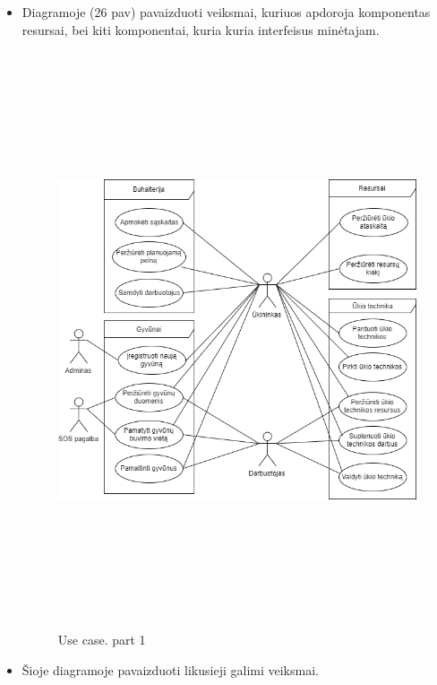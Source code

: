 \documentclass[oneside]{VUMIFPSkursinis}
\begin{document}
\begin{itemize}
\item Diagramoje (26 pav) pavaizduoti veiksmai, kuriuos apdoroja komponentas resursai, bei kiti komponentai, kuria kuria interfeisus minėtajam.
		\begin{figure}[H]
		\centering	
	\includegraphics[width=15cm,height=17cm,keepaspectratio]{ResursaiUseCase.png}
	\caption{Use case. part 1}
	\label{fig:UseCaseFull}
\end{figure}
\item Šioje diagramoje pavaizduoti likusieji galimi veiksmai.
		\begin{figure}[H]
		\centering	

\end{figure}
\end{itemize}
\end{document}
